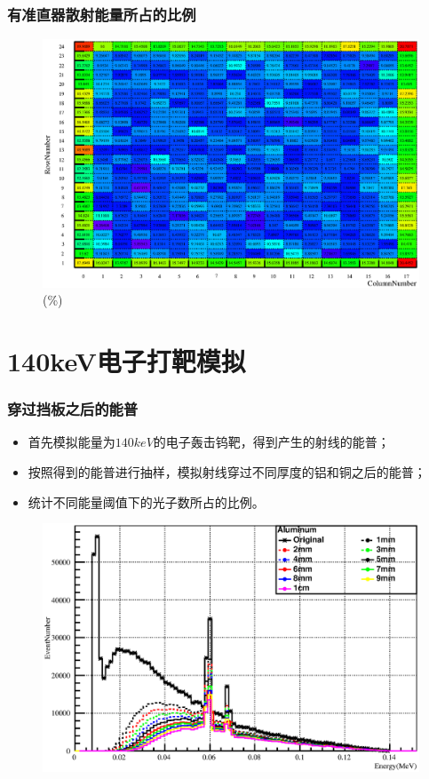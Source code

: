 \documentclass{beamer}
\newcommand{\liuhao}{\fontsize{7.875pt}{\baselineskip}\selectfont}
\begin{document}
\begin{CJK*}{UTF8}{gkai}
  \begin{frame}\frametitle{有准直器散射能量所占的比例}
    \begin{figure}[ht]
      \centering
      \includegraphics[width=\textwidth]{WithCollimatorScatteringRatioMerged.eps}
      \caption{(\%)}
    \end{figure}
  \end{frame}
  \section{140keV电子打靶模拟}
  \begin{frame}\frametitle{穿过挡板之后的能普}
    \begin{minipage}[t]{0.29\textwidth}
      \liuhao
      \begin{itemize}
	\item 首先模拟能量为$140keV$的电子轰击钨靶，得到产生的射线的能普；
	\item 按照得到的能普进行抽样，模拟射线穿过不同厚度的铝和铜之后的能普；
	\item 统计不同能量阈值下的光子数所占的比例。
      \end{itemize}
    \end{minipage}
    \begin{minipage}[t]{0.7\textwidth}
      \vskip -0.4cm
      \begin{figure}[ht]
        \includegraphics[width=\textwidth,height=0.58\textwidth]{140keVelectronEnergyAfterAluminumApron.eps}
        

\end{figure}
\end{minipage}
\end{frame}
\end{CJK*}
\end{document}
